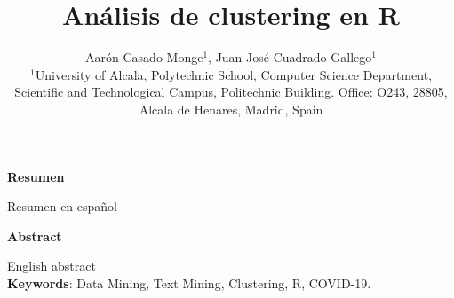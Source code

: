 \documentclass[10pt, a4paper]{article}
\providecommand{\keywords}[1]
    {
      \small	
      \textbf{\textit{Keywords---}} #1
    }
\begin{document}
    
    
    
    
    \renewcommand{\contentsname}{\subsection{\textbf{Índice}}}
    \tableofcontents
    
    \title{Análisis de clustering en R}
    
    \author{Aarón Casado Monge$^{1}$, Juan José Cuadrado Gallego$^{1}$  \\
      \small $^{1}$University of Alcala, Polytechnic School, Computer Science Department, Scientific and Technological Campus, Politechnic Building. Office: O243, 28805, Alcala de Henares, Madrid, Spain}
  
    
    
    
    
  \maketitle
    
    
    \begin{center}
    \textbf{Resumen}
    \end{center}
    Resumen en español \newline
    \begin{center}
    \textbf{Abstract}
    \end{center}
    English abstract \\ \newline
    \textbf{Keywords}: Data Mining, Text Mining, Clustering, R, COVID-19. \newline
    
\end{document}

